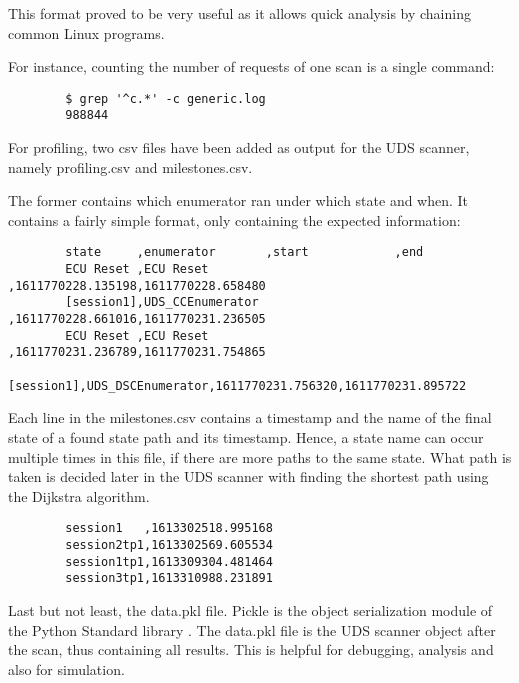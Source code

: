 This format proved to be very useful as it allows quick analysis by chaining common Linux programs.

For instance, counting the number of requests of one scan is a single command:
\begin{samepage}
    \begin{verbatim}
        $ grep '^c.*' -c generic.log
        988844
    \end{verbatim}
\end{samepage}

For profiling, two csv files have been added as output for the UDS scanner, namely profiling.csv and milestones.csv.

The former contains which enumerator ran under which state and when. It contains a fairly simple format, only containing the expected information:

\begin{samepage}
    \begin{verbatim}
        state     ,enumerator       ,start            ,end
        ECU Reset ,ECU Reset        ,1611770228.135198,1611770228.658480
        [session1],UDS_CCEnumerator ,1611770228.661016,1611770231.236505
        ECU Reset ,ECU Reset        ,1611770231.236789,1611770231.754865
        [session1],UDS_DSCEnumerator,1611770231.756320,1611770231.895722
    \end{verbatim}
\end{samepage}

Each line in the milestones.csv contains a timestamp and the name of the final state of a found state path and its timestamp. Hence, a state name can occur multiple times in this file, if there are more paths to the same state. What path is taken is decided later in the UDS scanner with finding the shortest path using the Dijkstra algorithm.

\begin{samepage}
    \begin{verbatim}
        session1   ,1613302518.995168
        session2tp1,1613302569.605534
        session1tp1,1613309304.481464
        session3tp1,1613310988.231891
    \end{verbatim}
\end{samepage}

Last but not least, the data.pkl file. Pickle is the object serialization module of the Python Standard library \cite{pickle}. The data.pkl file is the UDS scanner object after the scan, thus containing all results. This is helpful for debugging, analysis and also for simulation.


